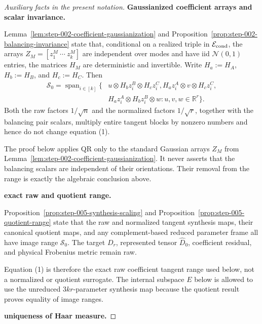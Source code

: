 \begin{proof}[Auxiliary facts in the present notation]


\medskip\noindent\textbf{Gaussianized coefficient arrays and scalar invariance.}\par

Lemma~\ref{lem:step-002-coefficient-gaussianization} and
Proposition~\ref{prop:step-002-balancing-invariance} state that, conditional
on a realized triple in \(\mathcal E_{\rm cond}\), the arrays
\(Z_M=[z_1^M\ \cdots\ z_k^M]\) are independent over modes and have iid
\(\mathcal N(0,1)\) entries, the matrices \(H_M\) are deterministic and
invertible. Write \(H_a:=H_A\), \(H_b:=H_B\), and \(H_c:=H_C\). Then
\[
\begin{aligned}
  \mathscr S_0
  =\operatorname{span}_{i\in[k]}\{&
    u\otimes H_bz_i^B\otimes H_cz_i^C,
    H_az_i^A\otimes v\otimes H_cz_i^C,\\
   &H_az_i^A\otimes H_bz_i^B\otimes w:
    u,v,w\in\mathbb R^r\}.
\end{aligned}\tag{1}
\]
Both the raw factors \(1/\sqrt n\) and the normalized factors \(1/\sqrt r\),
together with the balancing pair scalars, multiply entire tangent blocks by
nonzero numbers and hence do not change equation (1).

The proof below applies QR only to the standard Gaussian arrays \(Z_M\) from
Lemma~\ref{lem:step-002-coefficient-gaussianization}. It never asserts
that the balancing scalars are independent of their orientations. Their
removal from the range is exactly the algebraic conclusion above.


\medskip\noindent\textbf{exact raw and quotient range.}\par

Proposition~\ref{prop:step-005-synthesis-scaling} and
Proposition~\ref{prop:step-005-quotient-range} state that the raw and
normalized tangent synthesis maps, their canonical quotient maps, and any
complement-based reduced parameter frame all have image range
\(\mathscr S_0\). The target \(D_r\), represented tensor
\(\widehat D_0\), coefficient residual, and physical Frobenius metric remain
raw.

Equation (1) is therefore the exact
raw coefficient tangent range used below, not a normalized or
quotient surrogate. The internal subspace \(E\) below is allowed to use the
unreduced \(3kr\)-parameter synthesis map because the quotient
result proves equality of image ranges.


\medskip\noindent\textbf{uniqueness of Haar measure.}\par


\end{proof}
